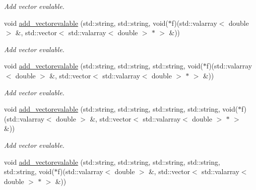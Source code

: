 \begin{CompactItemize}
\begin{CompactList}\small\item\em Add vector evalable. \item\end{CompactList}\item 
\hypertarget{classmeasurements_e61c92fc4cd8d409fb273a7c33a5ea17}{
void \hyperlink{classmeasurements_e61c92fc4cd8d409fb273a7c33a5ea17}{add\_\-vectorevalable} (std::string, std::string, void($\ast$f)(std::valarray$<$ double $>$ \&, std::vector$<$ std::valarray$<$ double $>$ $\ast$ $>$ \&))}
\label{classmeasurements_e61c92fc4cd8d409fb273a7c33a5ea17}

\begin{CompactList}\small\item\em Add vector evalable. \item\end{CompactList}\item 
\hypertarget{classmeasurements_6e6773648b428abe5bb4f021f067931c}{
void \hyperlink{classmeasurements_6e6773648b428abe5bb4f021f067931c}{add\_\-vectorevalable} (std::string, std::string, std::string, void($\ast$f)(std::valarray$<$ double $>$ \&, std::vector$<$ std::valarray$<$ double $>$ $\ast$ $>$ \&))}
\label{classmeasurements_6e6773648b428abe5bb4f021f067931c}

\begin{CompactList}\small\item\em Add vector evalable. \item\end{CompactList}\item 
\hypertarget{classmeasurements_399999c92be2b53a0c9272783fcad91a}{
void \hyperlink{classmeasurements_399999c92be2b53a0c9272783fcad91a}{add\_\-vectorevalable} (std::string, std::string, std::string, std::string, void($\ast$f)(std::valarray$<$ double $>$ \&, std::vector$<$ std::valarray$<$ double $>$ $\ast$ $>$ \&))}
\label{classmeasurements_399999c92be2b53a0c9272783fcad91a}

\begin{CompactList}\small\item\em Add vector evalable. \item\end{CompactList}\item 
\hypertarget{classmeasurements_2445e45b20657e475dfae42e2495a76b}{
void \hyperlink{classmeasurements_2445e45b20657e475dfae42e2495a76b}{add\_\-vectorevalable} (std::string, std::string, std::string, std::string, std::string, void($\ast$f)(std::valarray$<$ double $>$ \&, std::vector$<$ std::valarray$<$ double $>$ $\ast$ $>$ \&))}
\label{classmeasurements_2445e45b20657e475dfae42e2495a76b}


\end{CompactItemize}
